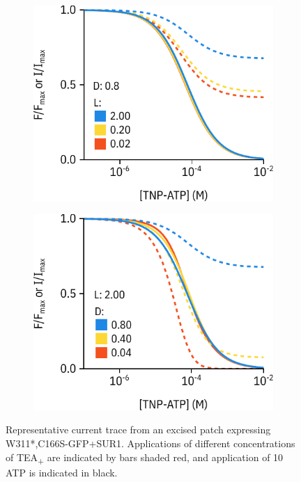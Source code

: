 \begin{figure}[h]
\begin{subfigure}[t]{0.45\textwidth}
		\includegraphics[width=\textwidth]{c166s_param_sim_1.pdf}
	\end{subfigure}
	\hfill
	\begin{subfigure}[t]{0.45\textwidth}
		\caption{}\label{ch5fig:l_d_sim_2}
		\centering
		\includegraphics[width=\textwidth]{c166s_param_sim_2.pdf}
	\end{subfigure}
	\caption[TEA\textsubscript{+} inhibits K\ATP{} channels at high concentrations]{
	 Representative current trace from an excised patch expressing W311*,C166S-GFP+SUR1.
	Applications of different concentrations of TEA\textsubscript{+} are indicated by bars shaded red, and application of \SI{10}{\milli\Molar} ATP is indicated in black.
}
\end{figure}
